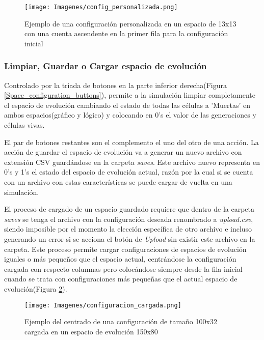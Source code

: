 \documentclass[]{article}
\begin{document}
				\begin{figure}[!h]
					\centering
					\texttt{[image: Imagenes/config\_personalizada.png]}
					\caption{Ejemplo de una configuración personalizada en un espacio de 13x13 con una cuenta ascendente en la primer fila para la configuración inicial}
					\label{Configuracion_personalizada}
				\end{figure}
			
			\subsubsection{Limpiar, Guardar o Cargar espacio de evolución}
				\justifying
				Controlado por la triada de botones en la parte inferior derecha(Figura \ref{Space_configuration_buttons}), permite a la simulación limpiar completamente el espacio de evolución cambiando el estado de todas las células a 'Muertas' en ambos espacios(gráfico y lógico) y colocando en 0's el valor de las generaciones y células vivas.
				
				\hfill\break
				\justifying
				El par de botones restantes son el complemento el uno del otro de una acción. La acción de guardar el espacio de evolución va a generar un nuevo archivo con extensión CSV guardándose en la carpeta \textit{saves}. Este archivo nuevo representa en 0's y 1's el estado del espacio de evolución actual, razón por la cual si se cuenta con un archivo con estas características se puede cargar de vuelta en una simulación.
				
				\hfill\break
				\justifying
				El proceso de cargado de un espacio guardado requiere que dentro de la carpeta \textit{saves} se tenga el archivo con la configuración deseada renombrado a \textit{upload.csv}, siendo imposible por el momento la elección específica de otro archivo e incluso generando un error si se acciona el botón de \textit{Upload} sin existir este archivo en la carpeta. Este proceso permite cargar configuraciones de espacios de evolución iguales o más pequeños que el espacio actual, centrándose la configuración cargada con respecto columnas pero colocándose siempre desde la fila inicial cuando se trata con configuraciones más pequeñas que el actual espacio de evolución(Figura \ref{Centrado_configuracion_cargada}).
				
				\begin{figure}[!h]
					\centering
					\texttt{[image: Imagenes/configuracion\_cargada.png]}
					\caption{Ejemplo del centrado de una configuración de tamaño 100x32 cargada en un espacio de evolución 150x80}
					\label{Centrado_configuracion_cargada}
				\end{figure}
\end{document}
